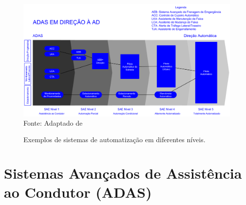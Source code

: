 \begin{figure}[!htb]
\centering
\caption{Exemplos de sistemas de automatização em diferentes níveis.} %
\includegraphics[scale=0.27]{adas2ad.png}\\  %
{\small Fonte: Adaptado de } %
\label{fig:adas2ad} %
\end{figure}



\section{Sistemas Avançados de Assistência ao Condutor (ADAS)}


